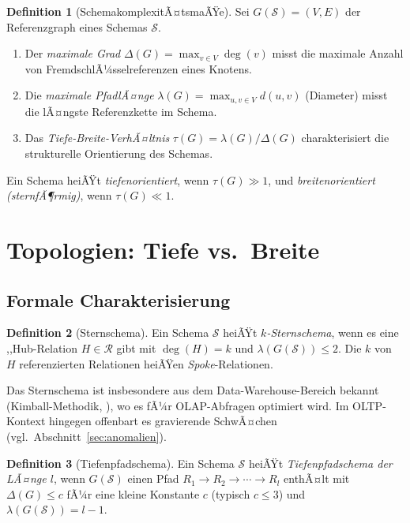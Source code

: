 ﻿\documentclass[12pt,a4paper]{article}
\theoremstyle{definition}
\newtheorem{definition}{Definition}[section]
\theoremstyle{remark}
\begin{document}
\begin{definition}[SchemakomplexitÃ¤tsmaÃŸe]
\label{def:masse}
Sei $G(\mathcal{S}) = (V, E)$ der Referenzgraph eines Schemas $\mathcal{S}$.
\begin{enumerate}[label=(\roman*)]
  \item Der \emph{maximale Grad} $\Delta(G) = \max_{v \in V} \deg(v)$ misst
        die maximale Anzahl von FremdschlÃ¼sselreferenzen eines Knotens.
  \item Die \emph{maximale PfadlÃ¤nge} $\lambda(G) = \max_{u,v \in V} d(u,v)$
        (Diameter) misst die lÃ¤ngste Referenzkette im Schema.
  \item Das \emph{Tiefe-Breite-VerhÃ¤ltnis} $\tau(G) = \lambda(G) / \Delta(G)$
        charakterisiert die strukturelle Orientierung des Schemas.
\end{enumerate}
\end{definition}

Ein Schema heiÃŸt \emph{tiefenorientiert}, wenn $\tau(G) \gg 1$, und
\emph{breitenorientiert (sternfÃ¶rmig)}, wenn $\tau(G) \ll 1$.

\section{Topologien: Tiefe vs.\ Breite}
\label{sec:topologien}

\subsection{Formale Charakterisierung}

\begin{definition}[Sternschema]
\label{def:stern}
Ein Schema $\mathcal{S}$ heiÃŸt \emph{$k$-Sternschema}, wenn es eine
,,Hub\grqq{}-Relation $H \in \mathcal{R}$ gibt mit $\deg(H) = k$ und
$\lambda(G(\mathcal{S})) \leq 2$. Die $k$ von $H$ referenzierten Relationen
heiÃŸen \emph{Spoke}-Relationen.
\end{definition}

Das Sternschema ist insbesondere aus dem Data-Warehouse-Bereich bekannt
(Kimball-Methodik, \cite{Kimball1996}), wo es fÃ¼r OLAP-Abfragen optimiert
wird. Im OLTP-Kontext hingegen offenbart es gravierende SchwÃ¤chen
(vgl.\ Abschnitt~\ref{sec:anomalien}).

\begin{definition}[Tiefenpfadschema]
\label{def:tiefenpfad}
Ein Schema $\mathcal{S}$ heiÃŸt \emph{Tiefenpfadschema der LÃ¤nge $l$},
wenn $G(\mathcal{S})$ einen Pfad $R_1 \to R_2 \to \cdots \to R_l$
enthÃ¤lt mit $\Delta(G) \leq c$ fÃ¼r eine kleine Konstante $c$ (typisch $c \leq 3$)
und $\lambda(G(\mathcal{S})) = l - 1$.
\end{definition}
\end{document}
